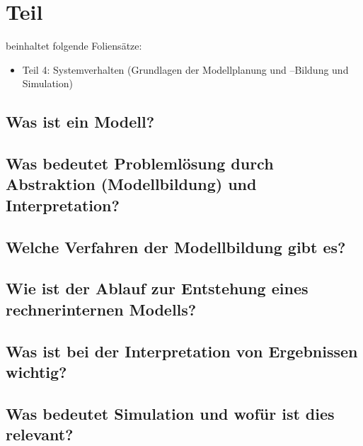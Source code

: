 \section{Teil}
beinhaltet folgende Foliensätze:

\begin{itemize}
    \item Teil 4:  Systemverhalten (Grundlagen der Modellplanung und –Bildung und Simulation)

\end{itemize}

\subsection{Was ist ein Modell?}


\subsection{Was bedeutet Problemlösung durch Abstraktion (Modellbildung) und Interpretation?}


\subsection{Welche Verfahren der Modellbildung gibt es?}


\subsection{Wie ist der Ablauf zur Entstehung eines rechnerinternen Modells?}


\subsection{Was ist bei der Interpretation von Ergebnissen wichtig?}


\subsection{Was bedeutet Simulation und wofür ist dies relevant?}